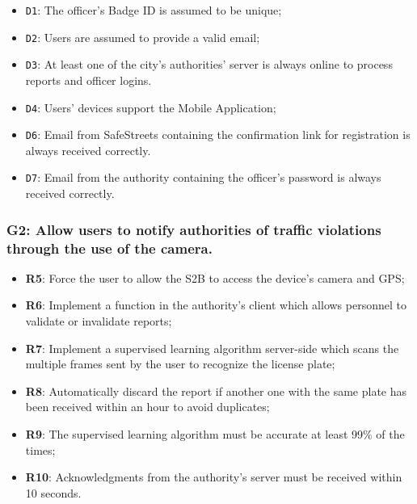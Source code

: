 \documentclass[12pt,a4paper]{article}
\begin{document}
	\begin{itemize}
			\item \texttt{D1}: The officer's Badge ID is assumed to be unique;
			\item \texttt{D2}: Users are assumed to provide a valid email;
			\item \texttt{D3}: At least one of the city's authorities' server is always online to process reports and officer logins.
			\item \texttt{D4}: Users' devices support the Mobile Application;
			\item \texttt{D6}: Email from SafeStreets containing the confirmation link for registration is always received correctly.
			\item \texttt{D7}: Email from the authority containing the officer's password is always received correctly.
	\end{itemize}

\subsubsection{G2: Allow users to notify authorities of traffic violations through the use of the camera.}
	
	\begin{itemize}
			\item \textbf{R5}: Force the user to allow the S2B to access the device's camera and GPS;
			\item \textbf{R6}: Implement a function in the authority's client which allows personnel to validate or invalidate reports;
			\item \textbf{R7}: Implement a supervised learning algorithm server-side which scans the multiple frames sent by the user to recognize the license plate;
			\item \textbf{R8}: Automatically discard the report if another one with the same plate has been received within an hour to avoid duplicates;
			\item \textbf{R9}: The supervised learning algorithm must be accurate at least 99\% of the times;
			\item \textbf{R10}: Acknowledgments from the authority's server must be received within 10 seconds.
	\end{itemize}
	
\end{document}

